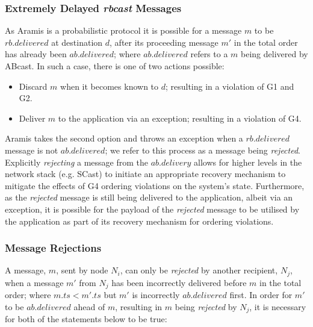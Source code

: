         \subsubsection*{Extremely Delayed \emph{rbcast} Messages}\label{ssec:abcast_rejection}
        As \textsf{Aramis} is a probabilistic protocol it is possible for a message $m$ to be $rb.delivered$ at destination $d$, after its proceeding message $m'$ in the total order has already been $ab.delivered$; where $ab.delivered$ refers to a $m$ being delivered by \textsf{ABcast}. In such a case, there is one of two actions possible:

         \begin{itemize}
            \item    Discard $m$ when it becomes known to $d$; resulting in a violation of G1 and G2.  
            
            \item    Deliver $m$ to the application via an exception; resulting in a violation of G4.  
        \end{itemize}                       
        
        \textsf{Aramis} takes the second option and throws an exception when a $rb.delivered$ message is not $ab.delivered$; we refer to this process as a message being \emph{rejected}.  Explicitly \emph{rejecting} a message from the $ab.delivery$ allows for higher levels in the network stack (e.g. \textsf{SCast}) to initiate an appropriate recovery mechanism to mitigate the effects of G4 ordering violations on the system's state.  Furthermore, as the \emph{rejected} message is still being delivered to the application, albeit via an exception, it is possible for the payload of the \emph{rejected} message to be utilised by the application as part of its recovery mechanism for ordering violations.    
        
        \subsubsection*{Message Rejections}
        A message, $m$, sent by node $N_i$, can only be \emph{rejected} by another recipient, $N_j$, when a message $m'$ from $N_j$ has been incorrectly delivered before $m$ in the total order; where $m.ts < m'.ts$ but $m'$ is incorrectly $ab.delivered$ first.  In order for $m'$ to be $ab.delivered$ ahead of $m$, resulting in $m$ being \emph{rejected} by $N_j$, it is necessary for both of the statements below to be true:
        
